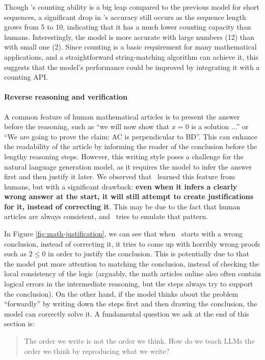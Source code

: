 Though \DV's counting ability is a big leap compared to the previous model for short sequences, a significant drop in \DV's accuracy still occurs as the sequence length grows from 5 to 10, indicating that it has a much lower counting capacity than humans. Interestingly, the model is more accurate with large numbers (12) than with small one (2). Since counting is a basic requirement for many mathematical applications, and a straightforward string-matching algorithm can achieve it, this suggests that the model's performance could be improved by integrating it with a counting API.

\paragraph{Reverse reasoning and verification}


A common feature of human mathematical articles is to present the answer before the reasoning, such as ``we will now show that $x = 0$ is a solution ...'' or ``We are going to prove the claim: AC is perpendicular to BD''. This can enhance the readability of the article by informing the reader of the conclusion before the lengthy reasoning steps. However, this writing style poses a challenge for the natural language generation model, as it requires the model to infer the answer first and then justify it later. We observed that \DV \ learned this feature from humans, but with a significant drawback: \textbf{even when it infers a clearly wrong answer at the start, it will still attempt to create justifications for it, instead of correcting it}. This may be due to the fact that human articles are always consistent, and \DV \ tries to emulate that pattern.

In Figure \ref{fig:math-justification}, we can see that when \DV \ starts with a wrong conclusion, instead of correcting it, it tries to come up with horribly wrong proofs such as $2 \leq 0$ in order to justify the conclusion. This is potentially due to that the model put more attention to matching the conclusion, instead of checking the local consistency of the logic (arguably, the math articles online also often contain logical errors in the intermediate reasoning, but the steps always try to support the conclusion). 
 On the other hand, if the model thinks about the problem ``forwardly'' by writing down the steps first and then drawing the conclusion, the model can correctly solve it. A fundamental question we ask at the end of this section is:
\begin{quote}
The order we write is not the order we think. How do we teach LLMs the order we think by reproducing what we write?
\end{quote}

